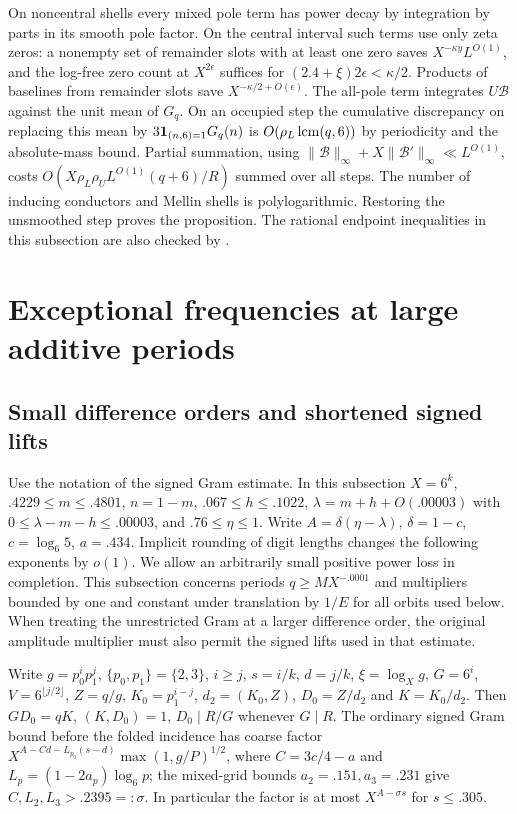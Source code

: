 \documentclass[11pt,a4paper]{article}
\theoremstyle{paperplain}
\numberwithin{equation}{section}
\begin{document}
On noncentral shells every mixed pole term has power decay by integration
by parts in its smooth pole factor. On the central interval such terms
use only zeta zeros: a nonempty set of remainder slots with at least
one zero saves $X^{-\kappa y}L^{O(1)}$, and the log-free zero count
at $X^{2\epsilon}$ suffices for $(2.4+\xi)2\epsilon<\kappa/2$.
Products of baselines from remainder slots save $X^{-\kappa/2+O(\epsilon)}$.
The all-pole term integrates $U\mathcal B$ against the unit mean of
$G_q$. On an occupied step the cumulative discrepancy on replacing
this mean by $3{\bf1}_{(n,6)=1}G_q(n)$ is $O(\rho_L\,{\rm lcm}(q,6))$
by periodicity and the absolute-mass bound. Partial summation, using
$\|\mathcal B\|_\infty+X\|\mathcal B'\|_\infty\ll L^{O(1)}$,
costs $O(X\rho_L\rho_U L^{O(1)}(q+6)/R)$ summed over all steps.
The number of inducing conductors and Mellin shells is polylogarithmic.
Restoring the unsmoothed step proves the proposition.
The rational endpoint inequalities in this subsection are also
checked by .

\section{Exceptional frequencies at large additive periods}
\subsection{Small difference orders and shortened signed lifts}
\label{six:sixmask-geometry}
Use the notation of the signed Gram estimate. In this subsection
$X=6^k$, $.4229\le m\le .4801$, $n=1-m$, $.067\le h\le .1022$,
$\lambda=m+h+O(.00003)$ with $0\le\lambda-m-h\le .00003$,
and $.76\le\eta\le1$. Write $A=\delta(\eta-\lambda)$, $\delta=1-c$,
$c=\log_6 5$, $a=.434$. Implicit rounding of digit lengths changes
the following exponents by $o(1)$. We allow an arbitrarily small
positive power loss in completion. This subsection concerns periods
$q\ge MX^{-.0001}$ and multipliers bounded by one and constant
under translation by $1/E$ for all orbits used below.
When treating the unrestricted Gram at a larger difference order,
the original amplitude multiplier must also permit the signed lifts
used in that estimate.

Write $g=p_0^i p_1^j$, $\{p_0,p_1\}=\{2,3\}$, $i\ge j$,
$s=i/k$, $d=j/k$, $\xi=\log_Xg$, $G=6^i$,
$V=6^{\lfloor j/2\rfloor}$, $Z=q/g$, $K_0=p_1^{i-j}$,
$d_2=(K_0,Z)$, $D_0=Z/d_2$ and $K=K_0/d_2$.
Then $GD_0=qK$, $(K,D_0)=1$, $D_0\mid R/G$ whenever $G\mid R$.
The ordinary signed Gram bound before the folded incidence has
coarse factor $X^{A-Cd-L_{p_0}(s-d)}\max(1,g/P)^{1/2}$, where
$C=3c/4-a$ and $L_p=(1-2a_p)\log_6 p$; the mixed-grid bounds
$a_2=.151,a_3=.231$ give $C,L_2,L_3>.2395=:\sigma$.
In particular the factor is at most $X^{A-\sigma s}$ for $s\le .305$.
\end{document}
